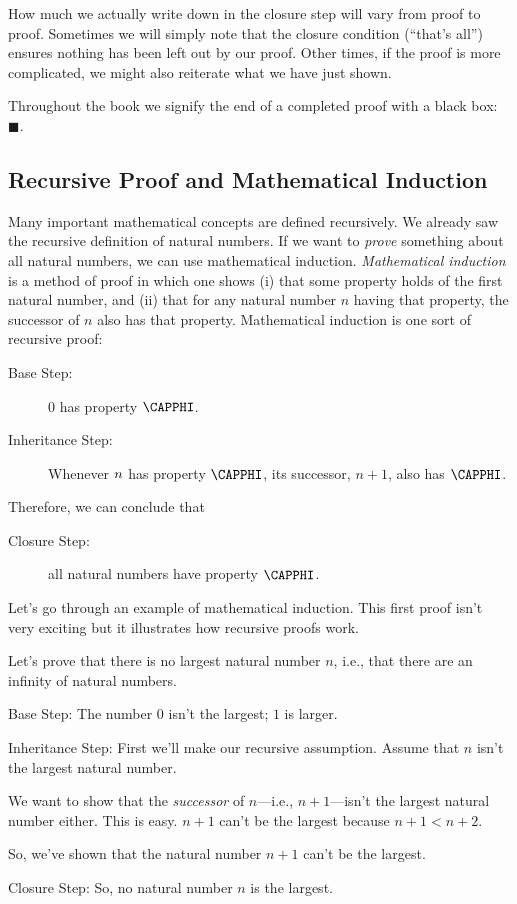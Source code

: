 How much we actually write down in the closure step will vary from proof to proof. 
Sometimes we will simply note that the closure condition (``that's all'') ensures nothing has been left out by our proof. 
Other times, if the proof is more complicated, we might also reiterate what we have just shown. 

Throughout the book we signify the end of a completed proof with a black box: $\blacksquare$.

\subsection{Recursive Proof and Mathematical Induction}
Many important mathematical concepts are defined recursively. 
We already saw the recursive definition of natural numbers. 
If we want to \emph{prove} something about all natural numbers, we can use mathematical induction.  \emph{Mathematical induction} is a method of proof in which one shows (i) that some property holds of the first natural number, and (ii) that for any natural number $n$ having that property, the successor of $n$ also has that property.  Mathematical induction is one sort of recursive proof:
\begin{description}
	\item[Base Step:] $0$ has property $\CAPPHI$. 
	\item[Inheritance Step:] Whenever $n$ has property $\CAPPHI$, its successor, $n+1$, also has $\CAPPHI$.
\end{description}
Therefore, we can conclude that
\begin{description}
	\item[Closure Step:] all natural numbers have property $\CAPPHI$.
\end{description}

Let's go through an example of mathematical induction. This first proof isn't very exciting but it illustrates how recursive proofs work.

\begin{majorILnc}{} 
	Let's prove that there is no largest natural number $n$, i.e., that there are an infinity of natural numbers. 
	
	\begin{PROOF}	\begin{cenumerate}
			\item Base Step: The number $0$ isn't the largest; $1$ is larger.
			\item Inheritance Step: First we'll make our recursive assumption.  Assume that $n$ isn't the largest natural number.
			
			We want to show that the \emph{successor} of $n$---i.e., $n+1$---isn't the largest natural number either.  This is easy.  $n+1$ can't be the largest because $n+1<n+2$.  
			
			So, we've shown that the natural number $n+1$ can't be the largest.
			\item Closure Step: So, no natural number $n$ is the largest.
	\end{cenumerate}	\end{PROOF}
\end{majorILnc}

